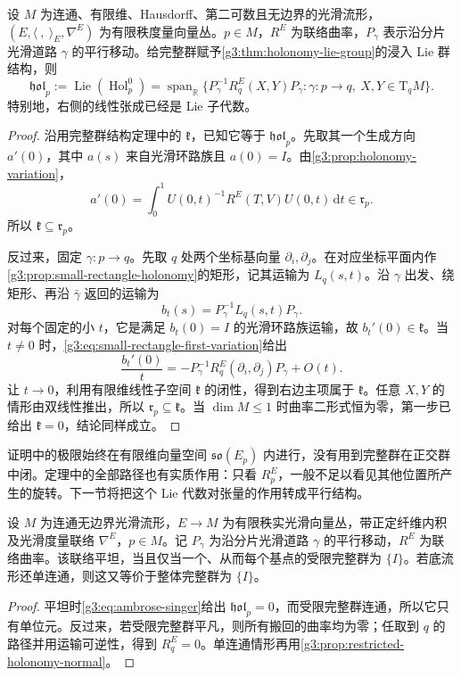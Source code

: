 \begin{theorem}\label{g3:thm:ambrose-singer}
	设 \(M\) 为连通、有限维、Hausdorff、第二可数且无边界的光滑流形，\((E,\langle\ ,\ \rangle_E,\nabla^E)\) 为有限秩度量向量丛。\(p\in M\)，\(R^E\) 为联络曲率，\(P_\gamma\) 表示沿分片光滑道路 \(\gamma\) 的平行移动。给完整群赋予\cref{g3:thm:holonomy-lie-group}的浸入 Lie 群结构，则
	\begin{equation}\label{g3:eq:ambrose-singer}
		\mathfrak{hol}_p
		:=\operatorname{Lie}(\operatorname{Hol}_p^0)
		=\operatorname{span}_{\mathbb R}
		\{P_\gamma^{-1}R^E_q(X,Y)P_\gamma:
		\gamma:p\to q,\ X,Y\in\mathrm T_qM\}.
	\end{equation}
	特别地，右侧的线性张成已经是 Lie 子代数。
\end{theorem}
\begin{proof}
	沿用完整群结构定理中的 \(\mathfrak k\)，已知它等于 \(\mathfrak{hol}_p\)。先取其一个生成方向 \(a'(0)\)，其中 \(a(s)\) 来自光滑环路族且 \(a(0)=I\)。由\cref{g3:prop:holonomy-variation}，
	\[
		a'(0)=\int_0^1U(0,t)^{-1}R^E(T,V)U(0,t)\,\mathrm dt\in\mathfrak r_p.
	\]
	所以 \(\mathfrak k\subseteq\mathfrak r_p\)。

	反过来，固定 \(\gamma:p\to q\)。先取 \(q\) 处两个坐标基向量 \(\partial_i,\partial_j\)。在对应坐标平面内作\cref{g3:prop:small-rectangle-holonomy}的矩形，记其运输为 \(L_q(s,t)\)。沿 \(\gamma\) 出发、绕矩形、再沿 \(\bar\gamma\) 返回的运输为
	\[
		b_t(s)=P_\gamma^{-1}L_q(s,t)P_\gamma.
	\]
	对每个固定的小 \(t\)，它是满足 \(b_t(0)=I\) 的光滑环路族运输，故 \(b_t'(0)\in\mathfrak k\)。当 \(t\ne0\) 时，\eqref{g3:eq:small-rectangle-first-variation}给出
	\[
		\frac{b_t'(0)}t
		=-P_\gamma^{-1}R^E_q(\partial_i,\partial_j)P_\gamma+O(t).
	\]
	让 \(t\to0\)，利用有限维线性子空间 \(\mathfrak k\) 的闭性，得到右边主项属于 \(\mathfrak k\)。任意 \(X,Y\) 的情形由双线性推出，所以 \(\mathfrak r_p\subseteq\mathfrak k\)。当 \(\dim M\leq1\) 时曲率二形式恒为零，第一步已给出 \(\mathfrak k=0\)，结论同样成立。
\end{proof}

证明中的极限始终在有限维向量空间 \(\mathfrak{so}(E_p)\) 内进行，没有用到完整群在正交群中闭。定理中的全部路径也有实质作用：只看 \(R^E_p\)，一般不足以看见其他位置所产生的旋转。下一节将把这个 Lie 代数对张量的作用转成平行结构。

\begin{corollary}\label{g3:cor:flat-restricted-holonomy}
	设 \(M\) 为连通无边界光滑流形，\(E\to M\) 为有限秩实光滑向量丛，带正定纤维内积及光滑度量联络 \(\nabla^E\)，\(p\in M\)。记 \(P_\gamma\) 为沿分片光滑道路 \(\gamma\) 的平行移动，\(R^E\) 为联络曲率。该联络平坦，当且仅当一个、从而每个基点的受限完整群为 \(\{I\}\)。若底流形还单连通，则这又等价于整体完整群为 \(\{I\}\)。
\end{corollary}
\begin{proof}
	平坦时\eqref{g3:eq:ambrose-singer}给出 \(\mathfrak{hol}_p=0\)，而受限完整群连通，所以它只有单位元。反过来，若受限完整群平凡，则所有搬回的曲率均为零；任取到 \(q\) 的路径并用运输可逆性，得到 \(R^E_q=0\)。单连通情形再用\cref{g3:prop:restricted-holonomy-normal}。
\end{proof}

